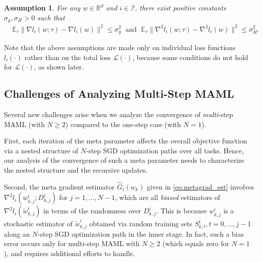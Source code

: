 \documentclass{osudissert96}
\newtheorem{assum}{Assumption}
\begin{document}
\begin{assum}\label{a3}
	For any $w\in\mathbb{R}^d$ and $i\in\mathcal{I}$, there exist positive constants $\sigma_g, \sigma_H>0$ such that  
	\begin{align*}
	&\mathbb{E}_{\tau}\|\nabla l_i(w; \tau)- \nabla l_i(w)\|^2 \leq \sigma_g^2\;\text{ and }\;
\mathbb{E}_{\tau}\|\nabla^2 l_i(w;\tau)- \nabla^2 l_i(w)\|^2 \leq \sigma_H^2.
	\end{align*}
\end{assum}

Note that the above assumptions are  made only on individual loss functions $l_i(\cdot)$ rather than on the total loss $\mathcal{L}(\cdot)$, because some  conditions do not hold for $\mathcal{L}(\cdot)$, as shown later. 

\subsection*{Challenges of Analyzing Multi-Step MAML}

Several new challenges arise when we analyze the convergence of {\em multi}-step MAML (with $N\ge 2$) compared to the one-step case (with $N=1$).

First, each iteration of  the meta parameter affects the overall objective function via a nested structure of $N$-step SGD optimization paths over all tasks. 
Hence, our analysis of the convergence of such a meta parameter 
needs to characterize the nested structure and the recursive updates. 

Second, the meta gradient estimator  {\small$\widehat G_i(w_k)$}  given in \cref{eq:metagrad_est} involves {\small$\nabla^2 l_i(w_{k,j}^i;D_{k,j}^i)$} for $ j=1,...,N-1$, which are all {\em biased} estimators of {\small$\nabla^2 l_i(\widetilde w^i_{k,j})$} in terms of the randomness over $D_{k,j}^i$.
This is because $ w^i_{k,j}$ is  a stochastic estimator of $\widetilde w^i_{k,j}$ obtained via  random training sets $S_{k,t}^i, t=0,...,j-1$ along an $N$-step SGD optimization path in the inner stage. In fact, such a bias error occurs only for multi-step MAML with $N\geq 2$ (which equals zero for $N=1$), and requires additional efforts to handle. 
\end{document}
